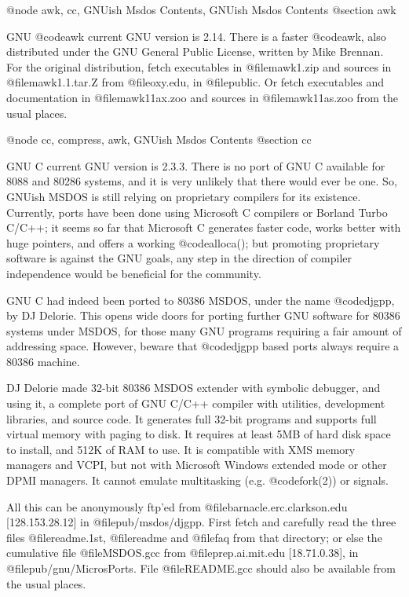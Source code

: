 @node awk, cc, GNUish Msdos Contents, GNUish Msdos Contents
@section awk

GNU @code{awk} current GNU version is 2.14.  There is a faster
@code{awk}, also distributed under the GNU General Public License,
written by Mike Brennan.  For the original distribution, fetch
executables in @file{mawk1.zip} and sources in @file{mawk1.1.tar.Z} from
@file{oxy.edu}, in @file{public}.  Or fetch executables and
documentation in @file{mawk11ax.zoo} and sources in @file{mawk11as.zoo}
from the usual places.

@node cc, compress, awk, GNUish Msdos Contents
@section cc

GNU C current GNU version is 2.3.3.  There is no port of GNU C available
for 8088 and 80286 systems, and it is very unlikely that there would
ever be one.  So, GNUish MSDOS is still relying on proprietary compilers
for its existence.  Currently, ports have been done using Microsoft C
compilers or Borland Turbo C/C++; it seems so far that Microsoft C
generates faster code, works better with huge pointers, and offers a
working @code{alloca()}; but promoting proprietary software is against
the GNU goals, any step in the direction of compiler independence would
be beneficial for the community.

GNU C had indeed been ported to 80386 MSDOS, under the name
@code{djgpp}, by DJ Delorie.  This opens wide doors for porting further
GNU software for 80386 systems under MSDOS, for those many GNU programs
requiring a fair amount of addressing space.  However, beware that
@code{djgpp} based ports always require a 80386 machine.

DJ Delorie made 32-bit 80386 MSDOS extender with symbolic debugger, and
using it, a complete port of GNU C/C++ compiler with utilities,
development libraries, and source code.  It generates full 32-bit
programs and supports full virtual memory with paging to disk.  It
requires at least 5MB of hard disk space to install, and 512K of RAM to
use.  It is compatible with XMS memory managers and VCPI, but not with
Microsoft Windows extended mode or other DPMI managers.  It cannot
emulate multitasking (e.g. @code{fork(2)}) or signals.

All this can be anonymously ftp'ed from @file{barnacle.erc.clarkson.edu}
[128.153.28.12] in @file{pub/msdos/djgpp}. First fetch and carefully
read the three files @file{readme.1st}, @file{readme} and @file{faq}
from that directory; or else the cumulative file @file{MSDOS.gcc} from
@file{prep.ai.mit.edu} [18.71.0.38], in @file{pub/gnu/MicrosPorts}.
File @file{README.gcc} should also be available from the usual places.

